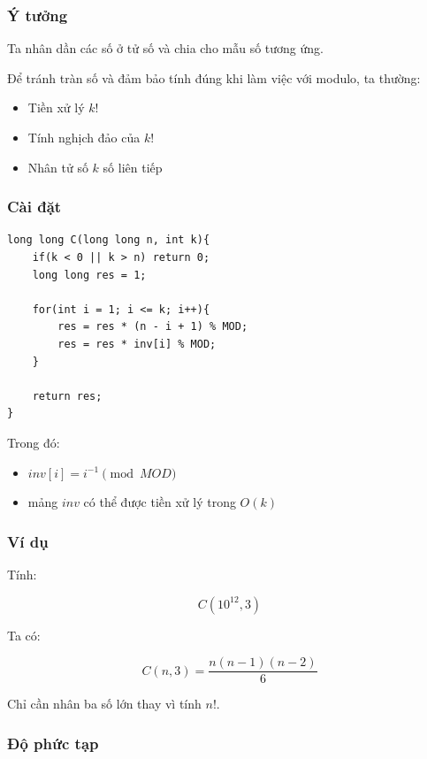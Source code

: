 \subsubsection*{Ý tưởng}

Ta nhân dần các số ở tử số và chia cho mẫu số tương ứng.

Để tránh tràn số và đảm bảo tính đúng khi làm việc với modulo, ta thường:

\begin{itemize}
\item Tiền xử lý $k!$
\item Tính nghịch đảo của $k!$
\item Nhân tử số $k$ số liên tiếp
\end{itemize}

\subsubsection*{Cài đặt}

\begin{tcolorbox}
\begin{verbatim}
long long C(long long n, int k){
    if(k < 0 || k > n) return 0;
    long long res = 1;

    for(int i = 1; i <= k; i++){
        res = res * (n - i + 1) % MOD;
        res = res * inv[i] % MOD;
    }

    return res;
}
\end{verbatim}
\end{tcolorbox}

Trong đó:

\begin{itemize}
\item $inv[i] = i^{-1} \pmod{MOD}$
\item mảng $inv$ có thể được tiền xử lý trong $O(k)$
\end{itemize}

\subsubsection*{Ví dụ}

Tính:

\[
C(10^{12},3)
\]

Ta có:

\[
C(n,3)=\frac{n(n-1)(n-2)}{6}
\]

Chỉ cần nhân ba số lớn thay vì tính $n!$.

\subsubsection*{Độ phức tạp}

